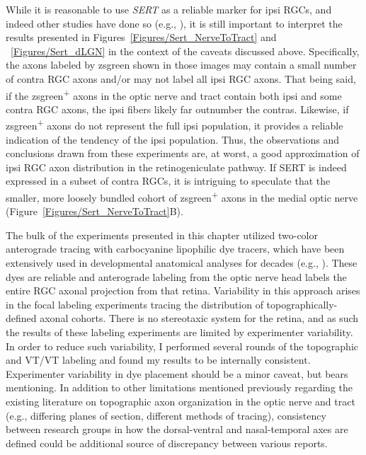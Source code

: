While it is reasonable to use \emph{SERT} as a reliable marker for ipsi RGCs, and indeed other studies have done so (e.g., ), it is still important to interpret the results presented in Figures~\ref{Figures/Sert_NerveToTract} and ~\ref{Figures/Sert_dLGN} in the context of the caveats discussed above. 
Specifically, the axons labeled by zsgreen shown in those images may contain a small number of contra RGC axons and/or may not label all ipsi RGC axons.
That being said, if the zsgreen\textsuperscript{+} axons in the optic nerve and tract contain both ipsi and some contra RGC axons, the ipsi fibers likely far outnumber the contras. 
Likewise, if zsgreen\textsuperscript{+} axons do not represent the full ipsi population, it provides a reliable indication of the tendency of the ipsi population.
Thus, the observations and conclusions drawn from these experiments are, at worst, a good approximation of ipsi RGC axon distribution in the retinogeniculate pathway.
If SERT is indeed expressed in a subset of contra RGCs, it is intriguing to speculate that the smaller, more loosely bundled cohort of zsgreen\textsuperscript{+} axons in the medial optic nerve (Figure~\ref{Figures/Sert_NerveToTract}B).

The bulk of the experiments presented in this chapter utilized two-color anterograde tracing with carbocyanine lipophilic dye tracers, which have been extensively used in developmental anatomical analyses for decades (e.g., ).
These dyes are reliable and anterograde labeling from the optic nerve head labels the entire RGC axonal projection from that retina.
Variability in this approach arises in the focal labeling experiments tracing the distribution of topographically-defined axonal cohorts.
There is no stereotaxic system for the retina, and as such the results of these labeling experiments are limited by experimenter variability.
In order to reduce such variability, I performed several rounds of the topographic and VT/VT labeling and found my results to be internally consistent.
Experimenter variability in dye placement should be a minor caveat, but bears mentioning.
In addition to other limitations mentioned previously regarding the existing literature on topographic axon organization in the optic nerve and tract (e.g., differing planes of section, different methods of tracing), consistency between research groups in how the dorsal-ventral and nasal-temporal axes are defined could be additional source of discrepancy between various reports.
